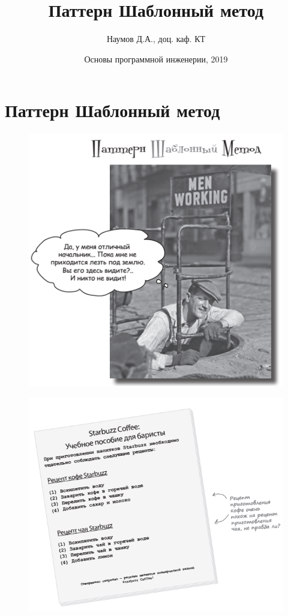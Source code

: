 \documentclass{beamer}
\title[Software Design]{Паттерн Шаблонный метод}
\author{Наумов Д.А., доц. каф. КТ}
\date[03.12.2019] {Основы программной инженерии, 2019}
\begin{document}
\begin{frame}
  \titlepage
\end{frame}
  
\section{Паттерн Шаблонный метод}

\begin{frame}
\begin{figure}[h]
\centering
\includegraphics[scale=0.6]{images/lec12-pic01.png}
\label{pic-sort}
\end{figure}
\end{frame}

\begin{frame}
\begin{figure}[h]
\centering
\includegraphics[scale=0.6]{images/lec12-pic02.png}
\label{pic-sort}
\end{figure}
\end{frame}
\end{document}
